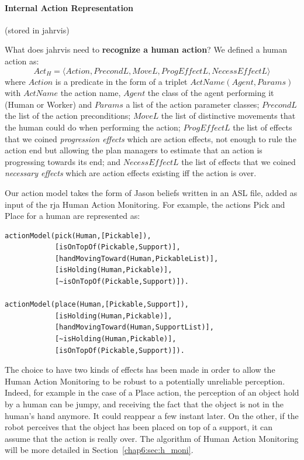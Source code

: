 \documentclass[a4paper,11pt,twoside]{StyleThese}
\begin{document}
\paragraph{Internal Action Representation}\label{chap6:par:act_rep}(\ie stored in \acrshort{jahrvis})\mbox{}

\bigskip
What does \acrshort{jahrvis} need to \textbf{recognize a human action}? We defined a human action as: 
\[Act_H=\langle Action,PrecondL,MoveL,ProgEffectL,NecessEffectL\rangle\] where $Action$ is a predicate in the form of a triplet $ActName(Agent,Params)$ with $ActName$ the action name, $Agent$ the class of the agent performing it (\eg Human or Worker) and $Params$ a list of the action parameter classes; $PrecondL$ the list of the action preconditions; $MoveL$ the list of distinctive movements that the human could do when performing the action; $ProgEffectL$ the list of effects that we coined \textit{progression effects} which are action effects, not enough to rule the action end but allowing the plan managers to estimate that an action is progressing towards its end; and $NecessEffectL$ the list of effects that we coined \textit{necessary effects} which are action effects existing iff the action is over.

Our action model takes the form of Jason beliefs written in an ASL file, added as input of the \acrshort{rja} Human Action Monitoring. For example, the actions Pick and Place for a human are represented as:
\begin{lstlisting}[style=aslDef]
actionModel(pick(Human,[Pickable]),
			[isOnTopOf(Pickable,Support)],
			[handMovingToward(Human,PickableList)],
			[isHolding(Human,Pickable)],
			[~isOnTopOf(Pickable,Support)]).

actionModel(place(Human,[Pickable,Support]),
			[isHolding(Human,Pickable)],
			[handMovingToward(Human,SupportList)],
			[~isHolding(Human,Pickable)],
			[isOnTopOf(Pickable,Support)]).
\end{lstlisting}

The choice to have two kinds of effects has been made in order to allow the Human Action Monitoring to be robust to a potentially unreliable perception. Indeed, for example in the case of a Place action, the perception of an object hold by a human can be jumpy, and receiving the fact that the object is not in the human's hand anymore. It could reappear a few instant later. On the other, if the robot perceives that the object has been placed on top of a support, it can assume that the action is really over. The algorithm of Human Action Monitoring will be more detailed in Section~\ref{chap6:sec:h_moni}.
\end{document}

